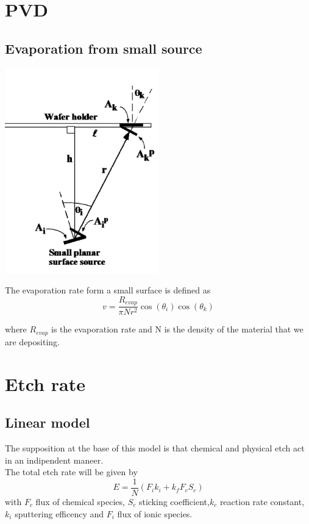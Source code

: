 
\section{PVD}

\subsection{Evaporation from small source}

\centering
\includegraphics[width=0.5\textwidth]{CVD_evap.png}\\
\raggedright


The evaporation rate form a small surface is defined as 
\begin{equation}
v=\frac{R_{evap}}{\pi N r^2}\cos(\theta_i )\cos(\theta_k)
\end{equation}

where $R_{evap}$ is the evaporation rate and N is the density of the material that we are depositing.\\



\section{Etch rate}

\subsection{Linear model}
The supposition at the base of this model is that chemical and physical etch act in an indipendent maneer.\\
The total etch rate will be given by
\begin{equation}
E=\frac{1}{N}\left( F_ik_i+k_fF_cS_c \right)
\end{equation}
with $F_c$ flux of chemical species, $S_c$ sticking coefficient,$k_c$ reaction rate constant, $k_i$ sputtering efficency and $F_i$ flux of ionic species.\\
\vspace{5mm}
